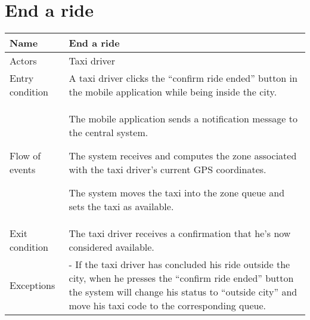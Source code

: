 \section{End a ride}
\begin{center}
\begin{longtable}{|l| p{9cm}|}
\hline
Name &
End a ride \\
\hline
Actors &
Taxi driver \\
\hline
Entry condition & 
A taxi driver clicks the ``confirm ride ended'' button in the mobile application while being inside the city. \\
\hline
Flow of events & 
The mobile application sends a notification message to the central system.

The system receives and computes the zone associated with the taxi driver's current GPS coordinates.

The system moves the taxi into the zone queue and sets the taxi as available. \\
\hline
Exit condition &
The taxi driver receives a confirmation that he's now considered available. \\
\hline
Exceptions &
- If the taxi driver has concluded his ride outside the city, when he presses the ``confirm ride ended'' button the system will change his status to ``outside city'' and move his taxi code to the corresponding queue.\\
\hline
\end{longtable}
\end{center}


